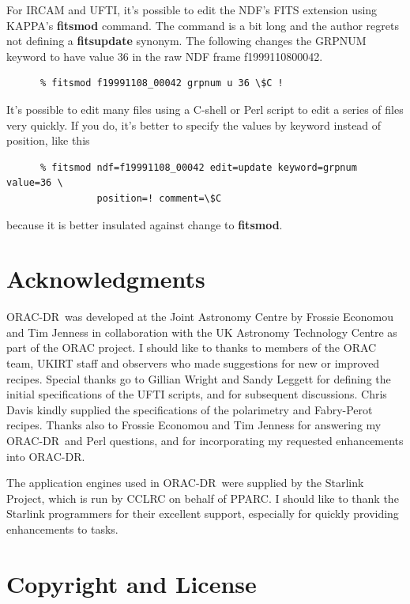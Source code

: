 \documentclass[twoside,11pt]{article}
\newcommand{\xref}[3]{#1}
\renewcommand{\_}{\texttt{\symbol{95}}}
\newcommand{\KAPPA}{{\footnotesize KAPPA}}
\newcommand{\ORACDR}{{\footnotesize ORAC-DR}}
\begin{document}
For IRCAM and UFTI, it's possible to edit the NDF's
\xref{FITS extension}{sun95}{se_fitsairlock} using \KAPPA's
\xref{{\bf fitsmod}}{sun95}{FITSMOD} command.  The command is a bit
long and the author regrets not defining a {\bf fitsupdate} synonym.
The following changes the GRPNUM keyword to have value 36 in the raw
NDF frame f19991108\_00042.

\begin{verbatim}
      % fitsmod f19991108_00042 grpnum u 36 \$C !
\end{verbatim}

It's possible to edit many files using a \xref{C-shell}{sc4}{} or Perl
script to edit a series of files very quickly.  If you do, it's better
to specify the values by keyword instead of position, like this

\begin{verbatim}
      % fitsmod ndf=f19991108_00042 edit=update keyword=grpnum value=36 \
                position=! comment=\$C
\end{verbatim}
because it is better insulated against change to {\bf fitsmod}.

\section{Acknowledgments}

\ORACDR\ was developed at the Joint Astronomy Centre by Frossie
Economou and Tim Jenness in collaboration with the UK Astronomy
Technology Centre as part of the ORAC project.  I should like to
thanks to members of the ORAC team, UKIRT staff and observers who made
suggestions for new or improved recipes.  Special thanks go to Gillian
Wright and Sandy Leggett for defining the initial specifications of
the UFTI scripts, and for subsequent discussions.  Chris Davis kindly
supplied the specifications of the polarimetry and Fabry-Perot
recipes.  Thanks also to Frossie Economou and Tim Jenness for
answering my \ORACDR\ and Perl questions, and for incorporating my
requested enhancements into \ORACDR.

The application engines used in \ORACDR\ were supplied by the Starlink
Project, which is run by CCLRC on behalf of PPARC.  I should like to
thank the Starlink programmers for their excellent support, especially
for quickly providing enhancements to tasks.

\section{Copyright and License}
\end{document}
